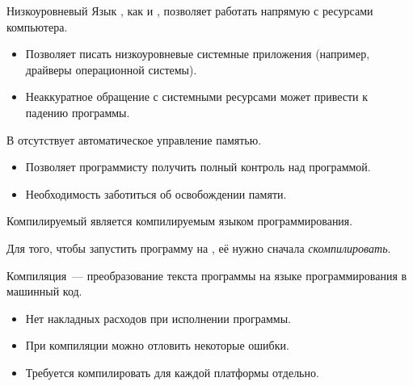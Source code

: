 \documentclass[aspectration=1610]{beamer}
\begin{document}
\begin{frame}{Низкоуровневый}
    Язык \langcpp, как и \langc, позволяет работать напрямую 
    с ресурсами компьютера.

    \begin{itemize}
        \item Позволяет писать низкоуровневые системные приложения 
            (например, драйверы операционной системы).
        
        \item
            Неаккуратное обращение с системными ресурсами 
            может привести к падению программы.
    \end{itemize}
    
    В \langcpp отсутствует автоматическое управление памятью. 
    \begin{itemize}
        \item Позволяет программисту получить полный контроль над программой.
            
        \item Необходимость заботиться об освобождении памяти.
    \end{itemize}
\end{frame}

\begin{frame}{Компилируемый}
\langcpp является компилируемым языком программирования.
\medskip

Для того, чтобы запустить программу на \langcpp, её нужно сначала
{\em скомпилировать}.
\medskip

Компиляция~--- преобразование текста программы на языке программирования
в машинный код.

\begin{itemize}
    \item Нет накладных расходов при исполнении программы.
    \item При компиляции можно отловить некоторые ошибки.
    \item Требуется компилировать для каждой платформы отдельно.
\end{itemize}

\end{frame}
\end{document}
